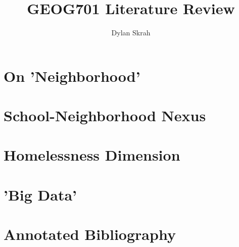 \documentclass[doc,longnamesfirst,sort,round,12pt,natbib]{apa6}
\begin{document}
\title{GEOG701 Literature Review}
\author{Dylan Skrah}
\maketitle
\pagebreak
\maketableofcontents
\pagebreak
\section{On 'Neighborhood'}


\section{School-Neighborhood Nexus}


\section{Homelessness Dimension}


\section{'Big Data'}


\pagebreak
\section{Annotated Bibliography}



\end{document}
